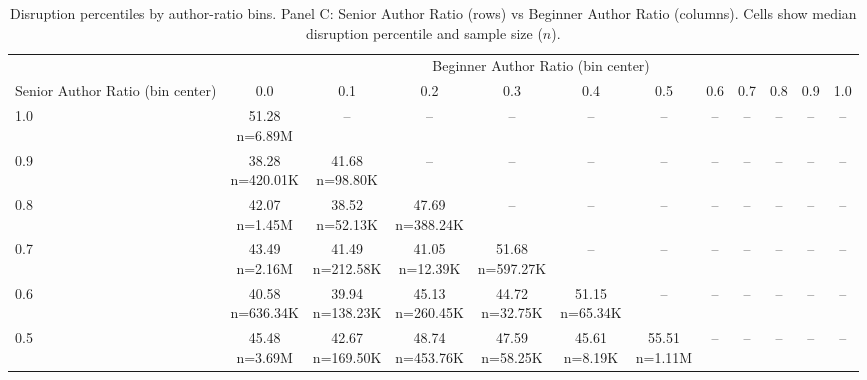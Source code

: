 \begin{table}\centering
            \caption{Disruption percentiles by author-ratio bins. Panel C: Senior Author Ratio (rows) vs Beginner Author Ratio (columns). Cells show median disruption percentile and sample size ($n$).}
            \scriptsize
            \setlength\tabcolsep{4pt}
            \renewcommand{\arraystretch}{1.1}
            \begin{tabular}{lccccccccccc}
            \toprule
            & \multicolumn{11}{c}{Beginner Author Ratio (bin center)} \\
            \cmidrule(lr){2-12}
            Senior Author Ratio (bin center) & 0.0 & 0.1 & 0.2 & 0.3 & 0.4 & 0.5 & 0.6 & 0.7 & 0.8 & 0.9 & 1.0 \\
            \midrule
            1.0 & \makecell{51.28 \\ \scriptsize n=6.89M} & -- & -- & -- & -- & -- & -- & -- & -- & -- & -- \\
0.9 & \makecell{38.28 \\ \scriptsize n=420.01K} & \makecell{41.68 \\ \scriptsize n=98.80K} & -- & -- & -- & -- & -- & -- & -- & -- & -- \\
0.8 & \makecell{42.07 \\ \scriptsize n=1.45M} & \makecell{38.52 \\ \scriptsize n=52.13K} & \makecell{47.69 \\ \scriptsize n=388.24K} & -- & -- & -- & -- & -- & -- & -- & -- \\
0.7 & \makecell{43.49 \\ \scriptsize n=2.16M} & \makecell{41.49 \\ \scriptsize n=212.58K} & \makecell{41.05 \\ \scriptsize n=12.39K} & \makecell{51.68 \\ \scriptsize n=597.27K} & -- & -- & -- & -- & -- & -- & -- \\
0.6 & \makecell{40.58 \\ \scriptsize n=636.34K} & \makecell{39.94 \\ \scriptsize n=138.23K} & \makecell{45.13 \\ \scriptsize n=260.45K} & \makecell{44.72 \\ \scriptsize n=32.75K} & \makecell{51.15 \\ \scriptsize n=65.34K} & -- & -- & -- & -- & -- & -- \\
0.5 & \makecell{45.48 \\ \scriptsize n=3.69M} & \makecell{42.67 \\ \scriptsize n=169.50K} & \makecell{48.74 \\ \scriptsize n=453.76K} & \makecell{47.59 \\ \scriptsize n=58.25K} & \makecell{45.61 \\ \scriptsize n=8.19K} & \makecell{55.51 \\ \scriptsize n=1.11M} & -- & -- & -- & -- & -- \\

\end{tabular}
\end{table}
